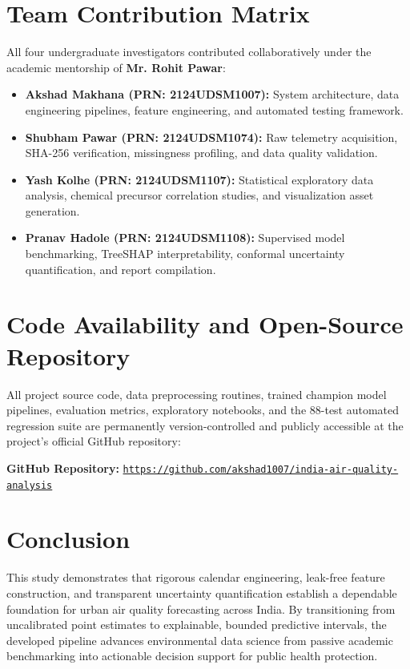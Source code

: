 \documentclass[11pt,a4paper]{report}
\begin{document}
\section{Team Contribution Matrix}
All four undergraduate investigators contributed collaboratively under the academic mentorship of \textbf{Mr. Rohit Pawar}:
\begin{itemize}
    \item \textbf{Akshad Makhana (PRN: 2124UDSM1007):} System architecture, data engineering pipelines, feature engineering, and automated testing framework.
    \item \textbf{Shubham Pawar (PRN: 2124UDSM1074):} Raw telemetry acquisition, SHA-256 verification, missingness profiling, and data quality validation.
    \item \textbf{Yash Kolhe (PRN: 2124UDSM1107):} Statistical exploratory data analysis, chemical precursor correlation studies, and visualization asset generation.
    \item \textbf{Pranav Hadole (PRN: 2124UDSM1108):} Supervised model benchmarking, TreeSHAP interpretability, conformal uncertainty quantification, and report compilation.
\end{itemize}

\section{Code Availability and Open-Source Repository}
All project source code, data preprocessing routines, trained champion model pipelines, evaluation metrics, exploratory notebooks, and the 88-test automated regression suite are permanently version-controlled and publicly accessible at the project's official GitHub repository:
\begin{center}
    \textbf{GitHub Repository:} \href{https://github.com/akshad1007/india-air-quality-analysis}{\texttt{https://github.com/akshad1007/india-air-quality-analysis}}
\end{center}

\section{Conclusion}
This study demonstrates that rigorous calendar engineering, leak-free feature construction, and transparent uncertainty quantification establish a dependable foundation for urban air quality forecasting across India. By transitioning from uncalibrated point estimates to explainable, bounded predictive intervals, the developed pipeline advances environmental data science from passive academic benchmarking into actionable decision support for public health protection.



\end{document}
